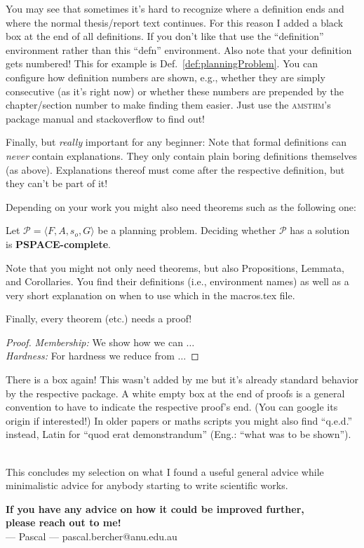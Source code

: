     You may see that sometimes it's hard to recognize where a definition ends and where the normal thesis/report text continues. For this reason I added a black box at the end of all definitions. If you don't like that use the ``definition'' environment rather than this ``defn'' environment. Also note that your definition gets numbered! This for example is Def.~\ref{def:planningProblem}. You can configure how definition numbers are shown, e.g., whether they are simply consecutive (as it's right now) or whether these numbers are prepended by the chapter/section number to make finding them easier. Just use the \textsc{amsthm}'s package manual and stackoverflow to find out!
  
    Finally, but \emph{really} important for any beginner: Note that formal definitions can \emph{never} contain explanations. They only contain plain boring definitions themselves (as above). Explanations thereof must come after the respective definition, but they can't be part of it!
  
    Depending on your work you might also need theorems such as the following one:
    \begin{thm}\label{thm:hardnessOfPlanningProblems}%
      Let $\mathcal{P}=\langle F, A, s_o, G\rangle$ be a planning problem. Deciding whether $\mathcal{P}$ has a solution is \textbf{PSPACE-complete}.
    \end{thm}
  
    Note that you might not only need theorems, but also Propositions, Lemmata, and Corollaries. You find their definitions (i.e., environment names) as well as a very short explanation on when to use which in the macros.tex file.
  
    Finally, every theorem (etc.) needs a proof!
  
    \begin{proof}%
      \emph{Membership:} We show how we can $\dots$\\
      \emph{Hardness:} For hardness we reduce from $\dots$
    \end{proof}
  
    There is a box again! This wasn't added by me but it's already standard behavior by the respective package. A white empty box at the end of proofs is a general convention to have to indicate the respective proof's end. (You can google its origin if interested!) In older papers or maths scripts you might also find ``q.e.d.'' instead, Latin for ``quod erat demonstrandum'' (Eng.: ``what was to be shown'').
  


\ \\[2em]
This concludes my selection on what I found a useful general advice while minimalistic advice for anybody starting to write scientific works.

\textbf{If you have any advice on how it could be improved further,\\
please reach out to me!}\\[.5em]
--- Pascal --- \hfill pascal.bercher@anu.edu.au
